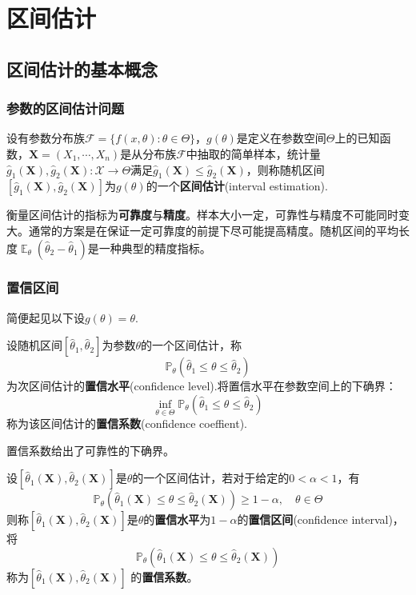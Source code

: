 \documentclass{ctexbook}
\DeclareMathOperator{\E}{\mathbb{E}}     %
\begin{document}
\chapter{区间估计}

\section{区间估计的基本概念}

\subsection{参数的区间估计问题}

\begin{definition}[区间估计]
    设有参数分布族$\mathcal{F}=\{f(x,\theta):\theta\in\Theta\}$，$g(\theta)$是定义在参数空间$\Theta$上的已知函数，$\mathbf{X}=(X_1,\cdots,X_n)$是从分布族$\mathcal{F}$中抽取的简单样本，统计量$\hat{g}_1(\mathbf{X}),\hat{g}_2(\mathbf{X}):\mathcal{X}\to\Theta$满足$\hat{g}_1(\mathbf{X})\le\hat{g}_2(\mathbf{X})$，则称随机区间$[\hat{g}_1(\mathbf{X}),\hat{g}_2(\mathbf{X})]$为$g(\theta)$的一个\textbf{区间估计}(interval estimation).
\end{definition}

衡量区间估计的指标为\textbf{可靠度}与\textbf{精度}。样本大小一定，可靠性与精度不可能同时变大。通常的方案是在保证一定可靠度的前提下尽可能提高精度。随机区间的平均长度$\E_\theta(\hat{\theta}_2-\hat{\theta}_1)$是一种典型的精度指标。

\subsection{置信区间}

简便起见以下设$g(\theta)=\theta$.

\begin{definition}[置信水平与置信系数]
    设随机区间$[\hat{\theta}_1,\hat{\theta}_2]$为参数$\theta$的一个区间估计，称
    $$\mathbb{P}_\theta(\hat{\theta}_1\le \theta\le \hat{\theta}_2)$$
    为次区间估计的\textbf{置信水平}(confidence level).将置信水平在参数空间上的下确界：
    $$\inf_{\theta\in\Theta}\mathbb{P}_\theta(\hat{\theta}_1\le \theta\le \hat{\theta}_2)$$
    称为该区间估计的\textbf{置信系数}(confidence coeffient).
\end{definition}

置信系数给出了可靠性的下确界。

\begin{definition}[置信区间]
    设$[\hat{\theta}_1(\mathbf{X}),\hat{\theta}_2(\mathbf{X})]$是$\theta$的一个区间估计，若对于给定的$0<\alpha<1$，有
    $$\mathbb{P}_\theta\left(\hat{\theta}_1(\mathbf{X})\le \theta\le\hat{\theta}_2(\mathbf{X})\right)\ge 1-\alpha,\quad\theta\in\Theta$$
    则称$[\hat{\theta}_1(\mathbf{X}),\hat{\theta}_2(\mathbf{X})]$是$\theta$的\textbf{置信水平}为$1-\alpha$的\textbf{置信区间}(confidence interval)，将
    $$\mathbb{P}_\theta\left(\hat{\theta}_1(\mathbf{X})\le \theta\le\hat{\theta}_2(\mathbf{X})\right)$$
    称为$[\hat{\theta}_1(\mathbf{X}),\hat{\theta}_2(\mathbf{X})]$
    的\textbf{置信系数}。
\end{definition}
\end{document}
